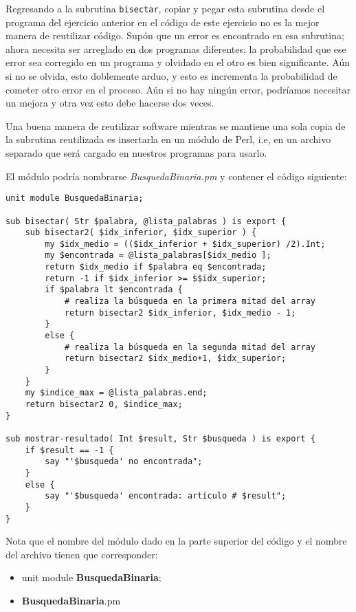\label{bisect_module}
Regresando a la subrutina {\tt bisectar}, copiar y 
pegar esta subrutina desde el programa del ejercicio anterior
en el código de este ejercicio no es la mejor manera 
de reutilizar código. Supón que un error es encontrado 
en esa subrutina; ahora necesita ser arreglado en dos programas
diferentes; la probabilidad que ese error sea corregido en
un programa y olvidado en el otro es bien significante.
Aún si no se olvida, esto doblemente arduo, y esto es 
incrementa la probabilidad de cometer otro error en el
proceso. Aún si no hay ningún error, podríamos necesitar
un mejora y otra vez esto debe hacerse dos veces.

Una buena manera de reutilizar software mientras 
se mantiene una sola copia de la subrutina reutilizada
es insertarla en un módulo de Perl, i.e, en un archivo separado
que será cargado en nuestros programas para usarlo.

El módulo podría nombrarse \emph{BusquedaBinaria.pm} y contener
el código siguiente:

\begin{verbatim}
unit module BusquedaBinaria;

sub bisectar( Str $palabra, @lista_palabras ) is export {
    sub bisectar2( $idx_inferior, $idx_superior ) {
        my $idx_medio = (($idx_inferior + $idx_superior) /2).Int;
        my $encontrada = @lista_palabras[$idx_medio ];
        return $idx_medio if $palabra eq $encontrada;
        return -1 if $idx_inferior >= $$idx_superior;
        if $palabra lt $encontrada {
            # realiza la búsqueda en la primera mitad del array
            return bisectar2 $idx_inferior, $idx_medio - 1;
        } 
        else {
            # realiza la búsqueda en la segunda mitad del array
            return bisectar2 $idx_medio+1, $idx_superior;
        }
    }
    my $indice_max = @lista_palabras.end;
    return bisectar2 0, $indice_max;
}

sub mostrar-resultado( Int $result, Str $busqueda ) is export {
    if $result == -1 {
        say "'$busqueda' no encontrada";
    }
    else {
        say "'$busqueda' encontrada: artículo # $result";
    }
}
\end{verbatim}

Nota que el nombre del módulo dado en la parte superior del
código y el nombre del archivo tienen que corresponder:
\begin{itemize}
	\item unit module {\bf BusquedaBinaria};
	\item {\bf BusquedaBinaria}.pm
\end{itemize}


